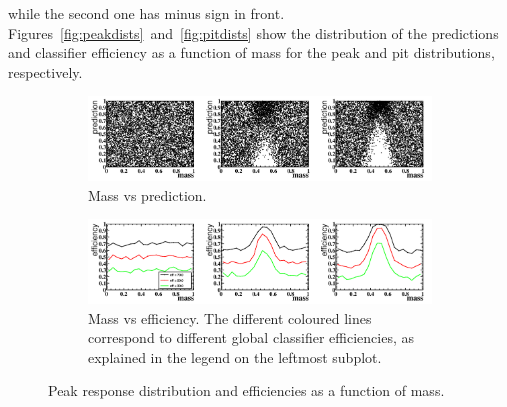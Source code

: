 {while the second one has minus sign in front. Figures~\ref{fig:peakdists}~and~\ref{fig:pitdists} show the distribution of the predictions
and classifier efficiency as a function of mass for the peak and pit distributions, respectively. 
\begin{figure}[H]
\label{fig:peakdists}
\centering
		\begin{subfigure}[b]{0.95\textwidth}
			\includegraphics[width=\textwidth]{graphs/PeakDistributions.png}
			\caption{Mass vs prediction.}
		\end{subfigure}
		\begin{subfigure}[b]{0.95\textwidth}
			\includegraphics[width=\textwidth]{graphs/PeakEffs.png}
			\caption{Mass vs efficiency. The different coloured lines correspond to
different global classifier efficiencies, as explained in the legend on the leftmost subplot.}
		\end{subfigure}
		\caption{Peak response distribution and efficiencies as a function of mass. }
\end{figure}

}
